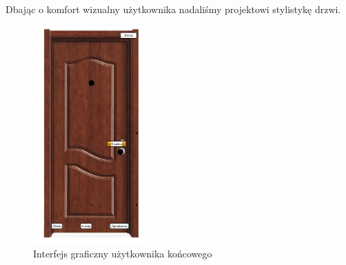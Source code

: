 \documentclass[a4paper,12pt]{article}
\begin{document}
    Dbając o komfort wizualny użytkownika nadaliśmy projektowi stylistykę drzwi.

    \begin{figure}[H]
        \centering
        \includegraphics[width=0.4\textwidth]{images/doors.png}
        \caption{Interfejs graficzny użytkownika końcowego}
    \end{figure}
\end{document}
